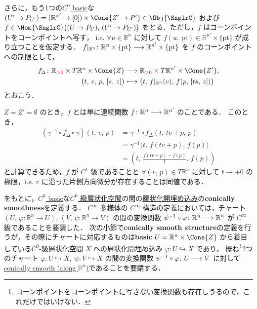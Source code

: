 \documentclass[TQFT_main]{subfiles}
\begin{document}
さらに，もう1つの\hyperref[def:C0-basic]{$C^0$ basic}な $(U' \to P_{U'}) = (\mathbb{R}^{n'} \to [0]) \times \Cone{Z' \to P'} \in \Obj{\SnglrC}$ および
$f \in \Hom{\SnglrC} \bigl( (U \to P_{U}),\, (U' \to P_{U'})  \bigr)$ をとる．ただし，$f$ はコーンポイントをコーンポイントへ写す，
i.e. $\forall u \in \mathbb{R}^n$ に対して $f (u,\, \mathrm{pt}) \in \mathbb{R}^{n'} \times \{\mathrm{pt}\}$ が成り立つことを仮定する．
$f|_{\mathbb{R}^n} \colon \mathbb{R}^n \times \{\mathrm{pt}\} \longrightarrow \mathbb{R}^{n'} \times \{\mathrm{pt}\}$ を $f$ のコーンポイントへの制限として，
\begin{align}
    f_{\Delta} \colon \mathbb{R}_{\textcolor{red}{>0}} \times T \mathbb{R}^n \times \Cone{Z} &\lto \mathbb{R}_{\textcolor{red}{>0}} \times T \mathbb{R}^{n'} \times \Cone{Z'}, \\
    \bigl( t,\, v,\, p,\, [s,\, z] \bigr) &\lmto \bigl( t,\, f|_{\mathbb{R}^n}(v),\, f(p,\, [ts,\, z]) \bigr)
\end{align}
とおこう．

\begin{myexample}[label=ex:cone-diff]{}
    $Z = Z' = \emptyset$ のとき，$f$ とは単に連続関数 $f \colon \mathbb{R}^n \longrightarrow \mathbb{R}^{n'}$ のことである．
    このとき，
    \begin{align}
        (\gamma^{-1} \circ f_{\Delta} \circ \gamma)(t,\, v,\, p)
        &= \gamma^{-1} \circ f_\Delta (t,\, tv+p,\, p) \\
        &= \gamma^{-1} \bigl(t,\, f(tv+p),\, f(p)\bigr) \\
        &= \left( t,\, \frac{f(tv+p) - f(p)}{t},\, f(p) \right)
    \end{align}
    と計算できるため，$f$ が $C^1$ 級であることと $\forall (v,\, p) \in T \mathbb{R}^n$ に対して $t \to +0$ の極限，i.e. $v$ に沿った片側方向微分が存在することは同値である．
\end{myexample}

をもとに，\hyperref[def:C0-basic]{$C^0$ basic}な\hyperref[def:Snglr-C0]{$C^0$ 級層状化空間}の間の\hyperref[def:strat-emb]{層状化開埋め込み}の\textbf{conically smoothness}を定義する．
$C^\infty$ 多様体の $C^\infty$ 構造の定義においては，チャート $(U,\, \varphi \colon \mathbb{R}^n \to U),\, (V,\, \psi \colon \mathbb{R}^n \to V)$ の間の変換関数 $\psi^{-1} \circ \varphi \colon \mathbb{R}^n \longrightarrow \mathbb{R}^{n}$ が $C^\infty$ 級であることを要請した．
次の小節で\textbf{conically smooth structure}の定義を行うが，その際にチャートに対応するものは\textbf{basic} $U = \mathbb{R}^n \times \Cone{Z}$ から着目している\hyperref[def:Snglr-C0]{$C^0$-級層状化空間} $X$ への\hyperref[def:strat-emb]{層状化開埋め込み} $\varphi \colon U \hookrightarrow X$ であり，
概ね\footnote{コーンポイントをコーンポイントに写さない変換関数も存在しうるので，これだけではいけない．}2つのチャート $\varphi \colon U \hookrightarrow X,\; \psi \colon V \hookrightarrow X$ の間の変換関数 $\psi^{-1} \circ \varphi \colon U \longrightarrow V$ に対して\hyperref[def:c-smooth-along]{conically smooth (along $\mathbb{R}^n$)}であることを要請する．
\end{document}
